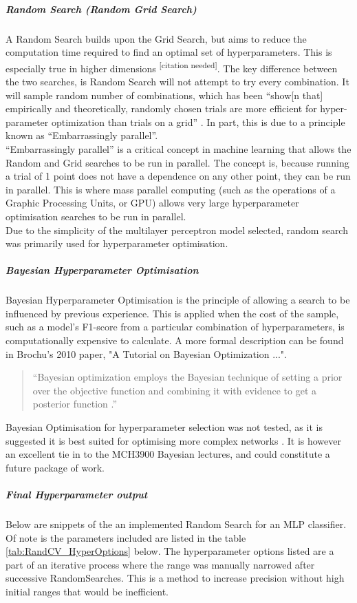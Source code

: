 \documentclass{UoNMCHA}
\newcommand{\citationneeded}{\textsuperscript{\color{blue} [citation needed]}}
\newcommand{\inlineQuote}[1]{``#1''}
\newcommand{\fancyquote}[1]{\begin{quotation}\inlineQuote{#1}\end{quotation}}
\numberwithin{equation}{section}
\begin{document}
\subparagraph{Random Search (Random Grid Search)}
A Random Search builds upon the Grid Search, but aims to reduce the computation time required to find an optimal set of hyperparameters. This is especially true in higher dimensions\citationneeded. The key difference between the two searches, is Random Search will not attempt to try every combination. It will sample random number of combinations, which has been \inlineQuote{show[n that] empirically and theoretically, randomly chosen trials are more efficient for hyper-parameter optimization than trials on a grid} \cite{bergstra2012random}. In part, this is due to a principle known as \inlineQuote{Embarrassingly parallel}.\\
\inlineQuote{Embarrassingly parallel} \cite{MauriceHerlihy2012} is a critical concept in machine learning that allows the Random and Grid searches to be run in parallel. The concept is, because running a trial of 1 point does not have a dependence on any other point, they can be run in parallel. This is where mass parallel computing (such as the operations of a Graphic Processing Units, or GPU) allows very large hyperparameter optimisation searches to be run in parallel. \\

Due to the simplicity of the multilayer perceptron model selected, random search was primarily used for hyperparameter optimisation.

\subparagraph{Bayesian Hyperparameter Optimisation}
Bayesian Hyperparameter Optimisation is the principle of allowing a search to be influenced by previous experience. This is applied when the cost of the sample, such as a model's F1-score from a particular combination of hyperparameters, is computationally expensive to calculate. A more formal description can be found in Brochu's 2010 paper, "A Tutorial on Bayesian Optimization ...".

\fancyquote{Bayesian optimization employs the Bayesian technique of setting a prior over the objective function and combining it with evidence to get a posterior function \cite{Brochu2010}.}

Bayesian Optimisation for hyperparameter selection was not tested, as it is suggested it is best suited for optimising more complex networks \cite{Snoek2012} \cite{Brochu2010}. It is however an excellent tie in to the MCH3900 Bayesian lectures, and could constitute a future package of work.

\subparagraph{Final Hyperparameter output}
Below are snippets of the an implemented Random Search for an MLP classifier. Of note is the parameters included are listed in the table \ref{tab:RandCV_HyperOptions} below. The hyperparameter options listed are a part of an iterative process where the range was manually narrowed after successive RandomSearches. This is a method to increase precision without high initial ranges that would be inefficient. 
\end{document}
